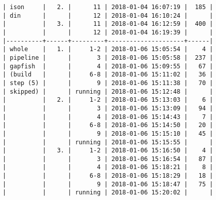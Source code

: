 \begin{verbatim}
| ison     |   2. |      11 | 2018-01-04 16:07:19 |  185 |
| din      |      |      12 | 2018-01-04 16:10:24 |      |
|          |   3. |      11 | 2018-01-04 16:12:59 |  400 |
|          |      |      12 | 2018-01-04 16:19:39 |      |
|----------+------+---------+---------------------+------|
| whole    |   1. |     1-2 | 2018-01-06 15:05:54 |    4 |
| pipeline |      |       3 | 2018-01-06 15:05:58 |  237 |
| gapfish  |      |       4 | 2018-01-06 15:09:55 |   67 |
| (build   |      |     6-8 | 2018-01-06 15:11:02 |   36 |
| step (5) |      |       9 | 2018-01-06 15:11:38 |   70 |
| skipped) |      | running | 2018-01-06 15:12:48 |      |
|          |   2. |     1-2 | 2018-01-06 15:13:03 |    6 |
|          |      |       3 | 2018-01-06 15:13:09 |   94 |
|          |      |       4 | 2018-01-06 15:14:43 |    7 |
|          |      |     6-8 | 2018-01-06 15:14:50 |   20 |
|          |      |       9 | 2018-01-06 15:15:10 |   45 |
|          |      | running | 2018-01-06 15:15:55 |      |
|          |   3. |     1-2 | 2018-01-06 15:16:50 |    4 |
|          |      |       3 | 2018-01-06 15:16:54 |   87 |
|          |      |       4 | 2018-01-06 15:18:21 |    8 |
|          |      |     6-8 | 2018-01-06 15:18:29 |   18 |
|          |      |       9 | 2018-01-06 15:18:47 |   75 |
|          |      | running | 2018-01-06 15:20:02 |      |
\end{verbatim}
